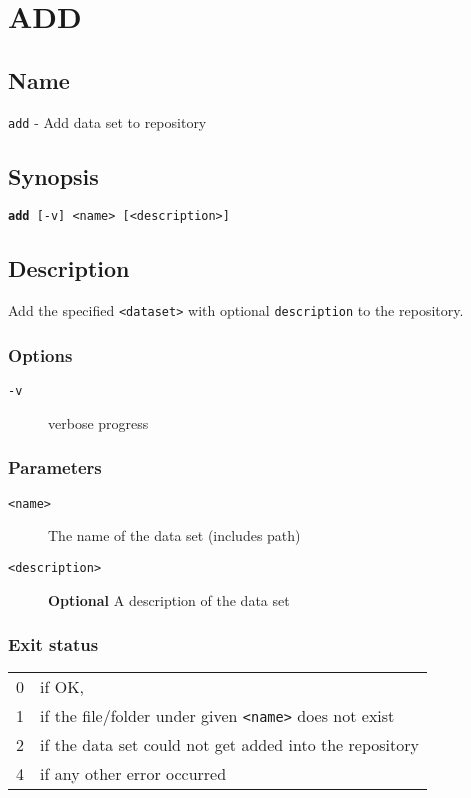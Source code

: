 \documentclass{article} %
\begin{document}
		\section*{ADD}
		\subsection*{Name}
		\texttt{add} - Add data set to repository
		\subsection*{Synopsis}
		\texttt{\textbf{add} [-v] <name> [<description>]}
		\subsection*{Description}
		Add the specified \texttt{<dataset>} with optional \texttt{description} to the repository.\\
		
		\noindent
		\subsubsection*{Options}
		\begin{description}
			\item[\texttt{-v}] verbose progress
		\end{description}
		
		\subsubsection*{Parameters}
		\begin{description}
			\item[\texttt{<name>}] The name of the data set (includes path)
			\item[\texttt{<description>}] \textbf{Optional} A description of the data set
		\end{description}
		\subsubsection*{Exit status}
		\begin{tabular}{ll}
			0 &  if OK,\\ 
			1 &  if the file/folder under given \texttt{<name>} does not exist\\ 
			2 &  if the data set could not get added into the repository\\
			4 &  if any other error occurred\\
		\end{tabular}
		
\end{document}
